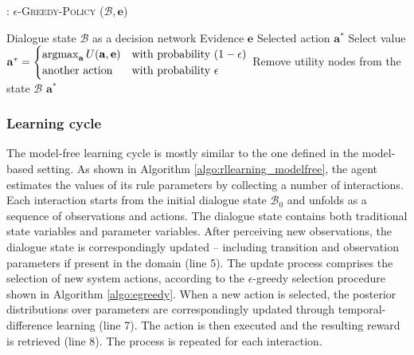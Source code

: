 \begin{algorithm}[h!]
\caption{: \textsc{$\epsilon$-Greedy-Policy} ($\mathcal{B}, \mathbf{e}$)}
\begin{algorithmic}[1] \vspace{1mm}
\REQUIRE Dialogue state $\mathcal{B}$ as a decision network
\REQUIRE Evidence $\mathbf{e}$
\ENSURE Selected action $\mathbf{a}^*$
\STATE Select value $\mathbf{a}^* = \begin{cases} \argmax_{\mathbf{a}} U(\mathbf{a}, \mathbf{e}) & \text{with probability } (1- \epsilon) \\ \text{another action} & \text{with probability } \epsilon \end{cases}$
\STATE Remove utility nodes from the state $\mathcal{B}$
\RETURN $\mathbf{a}^*$
\end{algorithmic}
\label{algo:egreedy}
\end{algorithm}

\subsubsection*{Learning cycle}

The model-free learning cycle is mostly similar to the one defined in the model-based setting.  As shown in Algorithm \ref{algo:rllearning_modelfree}, the agent estimates the values of its rule parameters by collecting a number of interactions.  Each interaction starts from the initial dialogue state $\mathcal{B}_0$ and unfolds as a sequence of observations and actions.  The dialogue state contains both traditional state variables and parameter variables.  After perceiving new observations, the dialogue state is correspondingly updated -- including transition and observation parameters if present in the domain (line 5).  The update process comprises the selection of new system actions, according to the $\epsilon$-greedy selection procedure shown in Algorithm \ref{algo:egreedy}. When a new action is selected, the posterior distributions over parameters are correspondingly updated through temporal-difference learning (line 7). The action is then executed and the resulting reward is retrieved (line 8).  The process is repeated for each interaction. 


